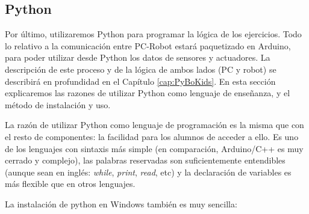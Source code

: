 \subsection{Python}\label{subsec:python}
Por último, utilizaremos Python para programar la lógica de los ejercicios. Todo lo relativo a la comunicación entre PC-Robot estará paquetizado en Arduino, para poder utilizar desde Python los datos de sensores y actuadores. La descripción de este proceso y de la lógica de ambos lados (PC y robot) se describirá en profundidad en el Capítulo \ref{cap:PyBoKids}. En esta sección explicaremos las razones de utilizar Python como lenguaje de enseñanza, y el método de instalación y uso. 
\par La razón de utilizar Python como lenguaje de programación es la misma que con el resto de componentes: la facilidad para los alumnos de acceder a ello. Es uno de los lenguajes con sintaxis más simple (en comparación, Arduino/C++ es muy cerrado y complejo), las palabras reservadas son suficientemente entendibles (aunque sean en inglés: \textit{while}, \textit{print}, \textit{read}, etc) y la declaración de variables es más flexible que en otros lenguajes.
\par La instalación de python en Windows también es muy sencilla:
